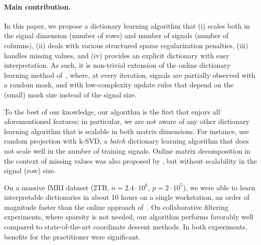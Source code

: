 \documentclass{article}
\begin{document}
\paragraph{Main contribution.}
In this paper, we propose
a dictionary learning algorithm that (i) scales
both in the signal dimension (number of rows) and number of signals (number of
columns), (ii) deals with various structured sparse regularization
penalties, (iii) handles missing values, and (iv) provides an explicit dictionary with easy interpretation.
As such, it is non-trivial extension of the online dictionary
learning method of~\citet{mairal_online_2010}, where, at every iteration, signals are
partially observed with a random mask, and with
low-complexity update rules that depend on the (small) mask size instead of the
signal size.

To the best of our knowledge, our algorithm is the first that enjoys all
aforementioned features; in particular, we are not aware of any other
dictionary learning algorithm that is scalable in both matrix dimensions. For
instance, \citet{pourkamali-anaraki_efficient_2015} use random projection with
k-SVD, a \textit{batch} dictionary learning
algorithm \citep{aharon_k-svd:_2006} that does not scale well in the number of training signals.
Online matrix decomposition in the context of missing values was
also proposed by \citet{szabo_online_2011}, but without scalability in the
signal (row) size.

On a massive fMRI dataset (2TB, $n=2.4\cdot 10^6$, $p=2\cdot 10^5$), we were able to learn interpretable dictionaries in about 10 hours on a single workstation,
an order of magnitude faster than the online
approach of~\citet{mairal_online_2010}.  On collaborative filtering
experiments, where sparsity is not needed, our algorithm
performs favorably well compared to state-of-the-art coordinate descent
methods. In both experiments, benefits for the practitioner were significant.
\end{document}
